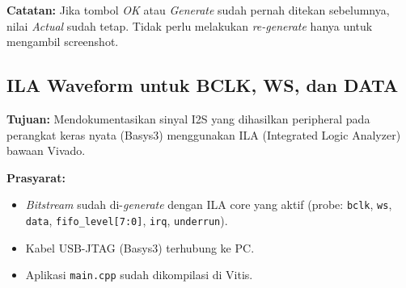 \textbf{Catatan:} Jika tombol \textit{OK} atau \textit{Generate} sudah pernah ditekan
sebelumnya, nilai \textit{Actual} sudah tetap. Tidak perlu melakukan \textit{re-generate}
hanya untuk mengambil screenshot.

\subsection{ILA Waveform untuk BCLK, WS, dan DATA}
\label{app:panduan-ila}

\textbf{Tujuan:} Mendokumentasikan sinyal I2S yang dihasilkan peripheral pada perangkat
keras nyata (Basys3) menggunakan ILA (Integrated Logic Analyzer) bawaan Vivado.

\textbf{Prasyarat:}
\begin{itemize}
\item \textit{Bitstream} sudah di-\textit{generate} dengan ILA core yang aktif (probe:
      \texttt{bclk}, \texttt{ws}, \texttt{data}, \texttt{fifo\_level[7:0]}, \texttt{irq},
      \texttt{underrun}).
\item Kabel USB-JTAG (Basys3) terhubung ke PC.
\item Aplikasi \texttt{main.cpp} sudah dikompilasi di Vitis.
\end{itemize}


